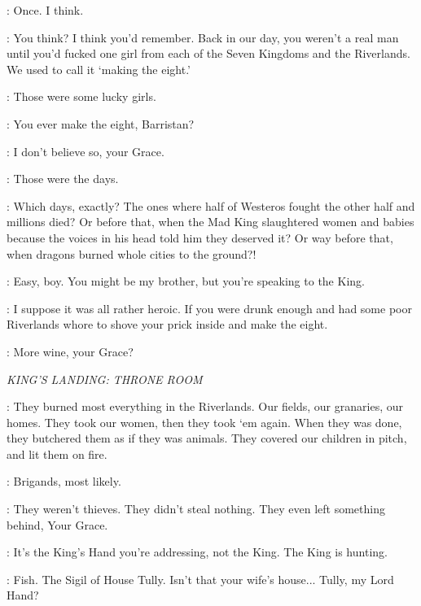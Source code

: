 \RENLY: Once. I think. 

\ROBERT: You think? I think you'd remember. Back in our day, you weren't a real man until you'd fucked one girl from each of the Seven Kingdoms and the Riverlands. We used to call it `making the eight.'

\RENLY: Those were some lucky girls. 

\ROBERT: You ever make the eight, Barristan? 

\SELMY: I don't believe so, your Grace. 

\ROBERT: Those were the days. 

\RENLY: Which days, exactly? The ones where half of Westeros fought the other half and millions died? Or before that, when the Mad King slaughtered women and babies because the voices in his head told him they deserved it? Or way before that, when dragons burned whole cities to the ground?! 

\ROBERT: Easy, boy. You might be my brother, but you're speaking to the King. 

\RENLY: I suppose it was all rather heroic. If you were drunk enough
and had some poor Riverlands whore to shove your prick inside and make
the eight.  

\LANCEL: More wine, your Grace? 


\scene

\textit{KING'S LANDING: THRONE ROOM} 


\SOUTHERNFARMER: They burned most everything in the Riverlands. Our fields, our granaries, our homes. They took our women, then they took `em again. When they was done, they butchered them as if they was animals. They covered our children in pitch, and lit them on fire. 

\PYCELLE: Brigands, most likely. 

\SOUTHERNFARMER: They weren't thieves. They didn't steal nothing. They even left something behind, Your Grace. 

\PYCELLE: It's the King's Hand you're addressing, not the King. The King is hunting. 


\LITTLEFINGER: Fish. The Sigil of House Tully.  Isn't that your wife's house... Tully, my Lord Hand?

